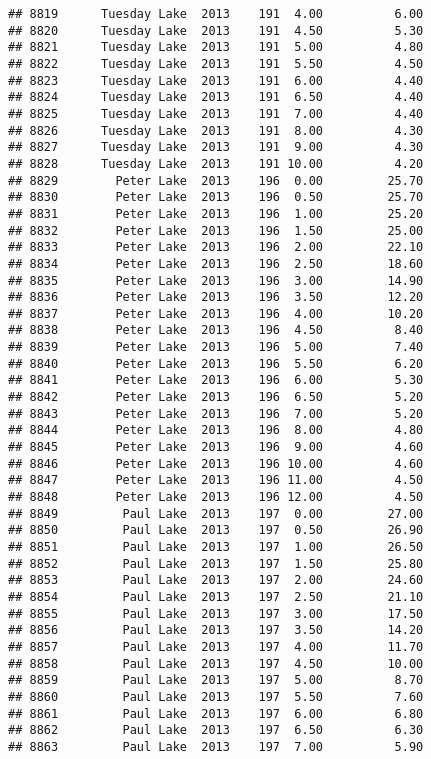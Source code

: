 \documentclass[
]{article}
\begin{document}
\begin{verbatim}
## 8819      Tuesday Lake  2013    191  4.00          6.00
## 8820      Tuesday Lake  2013    191  4.50          5.30
## 8821      Tuesday Lake  2013    191  5.00          4.80
## 8822      Tuesday Lake  2013    191  5.50          4.50
## 8823      Tuesday Lake  2013    191  6.00          4.40
## 8824      Tuesday Lake  2013    191  6.50          4.40
## 8825      Tuesday Lake  2013    191  7.00          4.40
## 8826      Tuesday Lake  2013    191  8.00          4.30
## 8827      Tuesday Lake  2013    191  9.00          4.30
## 8828      Tuesday Lake  2013    191 10.00          4.20
## 8829        Peter Lake  2013    196  0.00         25.70
## 8830        Peter Lake  2013    196  0.50         25.70
## 8831        Peter Lake  2013    196  1.00         25.20
## 8832        Peter Lake  2013    196  1.50         25.00
## 8833        Peter Lake  2013    196  2.00         22.10
## 8834        Peter Lake  2013    196  2.50         18.60
## 8835        Peter Lake  2013    196  3.00         14.90
## 8836        Peter Lake  2013    196  3.50         12.20
## 8837        Peter Lake  2013    196  4.00         10.20
## 8838        Peter Lake  2013    196  4.50          8.40
## 8839        Peter Lake  2013    196  5.00          7.40
## 8840        Peter Lake  2013    196  5.50          6.20
## 8841        Peter Lake  2013    196  6.00          5.30
## 8842        Peter Lake  2013    196  6.50          5.20
## 8843        Peter Lake  2013    196  7.00          5.20
## 8844        Peter Lake  2013    196  8.00          4.80
## 8845        Peter Lake  2013    196  9.00          4.60
## 8846        Peter Lake  2013    196 10.00          4.60
## 8847        Peter Lake  2013    196 11.00          4.50
## 8848        Peter Lake  2013    196 12.00          4.50
## 8849         Paul Lake  2013    197  0.00         27.00
## 8850         Paul Lake  2013    197  0.50         26.90
## 8851         Paul Lake  2013    197  1.00         26.50
## 8852         Paul Lake  2013    197  1.50         25.80
## 8853         Paul Lake  2013    197  2.00         24.60
## 8854         Paul Lake  2013    197  2.50         21.10
## 8855         Paul Lake  2013    197  3.00         17.50
## 8856         Paul Lake  2013    197  3.50         14.20
## 8857         Paul Lake  2013    197  4.00         11.70
## 8858         Paul Lake  2013    197  4.50         10.00
## 8859         Paul Lake  2013    197  5.00          8.70
## 8860         Paul Lake  2013    197  5.50          7.60
## 8861         Paul Lake  2013    197  6.00          6.80
## 8862         Paul Lake  2013    197  6.50          6.30
## 8863         Paul Lake  2013    197  7.00          5.90

\end{verbatim}
\end{document}
